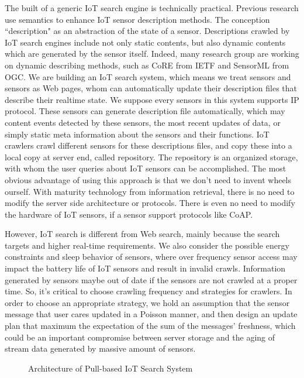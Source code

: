 \documentclass[conference]{IEEEtran}
\begin{document}
The built of a generic IoT search engine is technically practical. Previous research use semantics\cite{Pfisterer2011} to enhance IoT sensor description methods. The conception ``description" as an abstraction of the state of a sensor.
Descriptions crawled by IoT search engines include not only static contents, but also dynamic contents which are generated by the sensor itself. Indeed, many research group are working on dynamic describing methods, such as CoRE\cite{CoREWorkingGroup2012} from IETF and SensorML\cite{botts2007opengis} from OGC. 
We are building an IoT search system, which means we treat sensors and sensors as Web pages, whom can automatically update their description files that describe their realtime state.
We suppose every sensors in this system supports IP protocol. These sensors can generate description file automatically, which may content events detected by these sensors, the most recent updates of data, or simply static meta information about the sensors and their functions. 
IoT crawlers crawl different sensors for these descriptions files, and copy these into a local copy at server end, called repository. The repository is an organized storage, with whom the user queries about IoT sensors can be accomplished.
The most obvious advantage of using this approach is that we don't need to invent wheels ourself. With maturity technology from information retrieval, there is no need to modify the server side architecture or protocols. There is even no need to modify the hardware of IoT sensors, if a sensor support protocols like CoAP.


However, IoT search is different from Web search, mainly because the search targets and higher real-time requirements. We also consider the possible energy constraints and sleep behavior of sensors, where over frequency sensor access may impact the battery life of IoT sensors and result in invalid crawls. Information generated by sensors maybe out of date if the sensors are not crawled at a proper time. So, it's critical to choose crawling frequency and strategies for crawlers. 
In order to choose an appropriate strategy, we hold an assumption that the sensor message that user cares updated in a Poisson manner, and then design an update plan that maximum the expectation of the sum of the messages' freshness, which could be an important compromise between server storage and the aging of stream data generated by massive amount of sensors.

\begin{figure}
	\centering
	
	\captionsetup{justification=centering}
	\caption{Architecture of Pull-based IoT Search System}
	\label{fig:architecture}
\end{figure}
\end{document}
